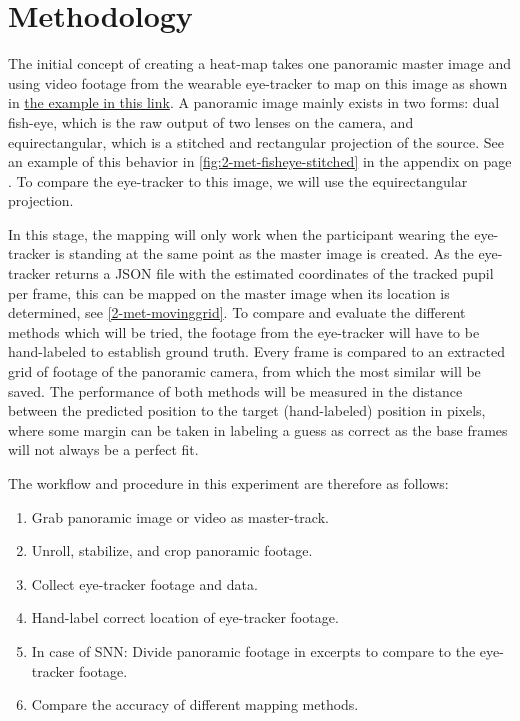 \documentclass[sigconf, natbib=false, nonacm]{acmart}
\begin{document}
\section{Methodology}\label{sec:methodology}
    The initial concept of creating a heat-map takes one panoramic master image and using video footage from the wearable eye-tracker to map on this image as shown in \href{https://www.youtube.com/playlist?list=PLzh4mA3kUCz2J9pJhzKEI88LiCYvB9BQk}{the example in this link\footnotemark}. A panoramic image mainly exists in two forms: dual fish-eye, which is the raw output of two lenses on the camera, and equirectangular, which is a stitched and rectangular projection of the source. See an example of this behavior in \autoref{fig:2-met-fisheye-stitched} in the appendix on page \pageref{fig:2-met-fisheye-stitched}. To compare the eye-tracker to this image, we will use the equirectangular projection. 
    
    In this stage, the mapping will only work when the participant wearing the eye-tracker is standing at the same point as the master image is created. As the eye-tracker returns a JSON file with the estimated coordinates of the tracked pupil per frame, this can be mapped on the master image when its location is determined, see \autoref{2-met-movinggrid}. To compare and evaluate the different methods which will be tried, the footage from the eye-tracker will have to be hand-labeled to establish ground truth. Every frame is compared to an extracted grid of footage of the panoramic camera, from which the most similar will be saved. The performance of both methods will be measured in the distance between the predicted position to the target (hand-labeled) position in pixels, where some margin can be taken in labeling a guess as correct as the base frames will not always be a perfect fit.
    
    The workflow and procedure in this experiment are therefore as follows: 
    
    \begin{enumerate}
        \item Grab panoramic image or video as master-track. 
        \item Unroll, stabilize, and crop panoramic footage.
        \item Collect eye-tracker footage and data.
        \item Hand-label correct location of eye-tracker footage.
        \item In case of SNN: Divide panoramic footage in excerpts to compare to the eye-tracker footage.
        \item Compare the accuracy of different mapping methods.
    \end{enumerate}
    
\end{document}
